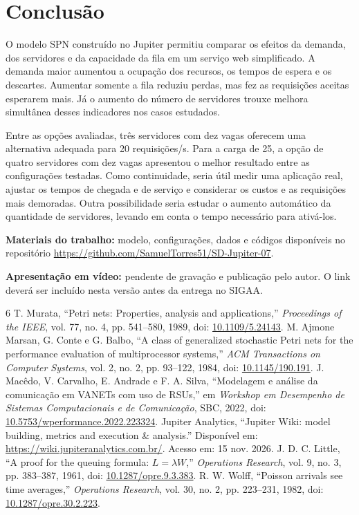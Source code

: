 \documentclass[10pt]{ieeeconf}
\begin{document}
\section{Conclusão}
O modelo SPN construído no Jupiter permitiu comparar os efeitos da demanda, dos servidores e da capacidade da fila em um serviço web simplificado. A demanda maior aumentou a ocupação dos recursos, os tempos de espera e os descartes. Aumentar somente a fila reduziu perdas, mas fez as requisições aceitas esperarem mais. Já o aumento do número de servidores trouxe melhora simultânea desses indicadores nos casos estudados.

Entre as opções avaliadas, três servidores com dez vagas oferecem uma alternativa adequada para 20 requisições/s. Para a carga de 25, a opção de quatro servidores com dez vagas apresentou o melhor resultado entre as configurações testadas. Como continuidade, seria útil medir uma aplicação real, ajustar os tempos de chegada e de serviço e considerar os custos e as requisições mais demoradas. Outra possibilidade seria estudar o aumento automático da quantidade de servidores, levando em conta o tempo necessário para ativá-los.

\noindent\textbf{Materiais do trabalho:} modelo, configurações, dados e códigos disponíveis no repositório \url{https://github.com/SamuelTorres51/SD-Jupiter-07}.\par
\noindent\textbf{Apresentação em vídeo:} pendente de gravação e publicação pelo autor. O link deverá ser incluído nesta versão antes da entrega no SIGAA.

\begin{thebibliography}{6}
 T. Murata, ``Petri nets: Properties, analysis and applications,'' \textit{Proceedings of the IEEE}, vol. 77, no. 4, pp. 541--580, 1989, doi: \href{https://doi.org/10.1109/5.24143}{10.1109/5.24143}.
 M. Ajmone Marsan, G. Conte e G. Balbo, ``A class of generalized stochastic Petri nets for the performance evaluation of multiprocessor systems,'' \textit{ACM Transactions on Computer Systems}, vol. 2, no. 2, pp. 93--122, 1984, doi: \href{https://doi.org/10.1145/190.191}{10.1145/190.191}.
 J. Macêdo, V. Carvalho, E. Andrade e F. A. Silva, ``Modelagem e análise da comunicação em VANETs com uso de RSUs,'' em \textit{Workshop em Desempenho de Sistemas Computacionais e de Comunicação}, SBC, 2022, doi: \href{https://doi.org/10.5753/wperformance.2022.223324}{10.5753/wperformance.2022.223324}.
 Jupiter Analytics, ``Jupiter Wiki: model building, metrics and execution \& analysis.'' Disponível em: \url{https://wiki.jupiteranalytics.com.br/}. Acesso em: 15 nov. 2026.
 J. D. C. Little, ``A proof for the queuing formula: $L=\lambda W$,'' \textit{Operations Research}, vol. 9, no. 3, pp. 383--387, 1961, doi: \href{https://doi.org/10.1287/opre.9.3.383}{10.1287/opre.9.3.383}.
 R. W. Wolff, ``Poisson arrivals see time averages,'' \textit{Operations Research}, vol. 30, no. 2, pp. 223--231, 1982, doi: \href{https://doi.org/10.1287/opre.30.2.223}{10.1287/opre.30.2.223}.
\end{thebibliography}
\end{document}
